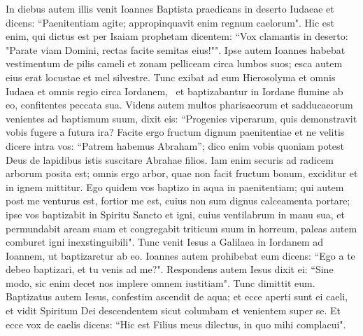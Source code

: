 \begin{biblechapter}  
\verse In diebus autem illis venit Ioannes Baptista praedicans in deserto Iudaeae 
\verse et dicens: “Paenitentiam agite; appropinquavit enim regnum caelorum". 
\verse Hic est enim, qui dictus est per Isaiam prophetam dicentem: “Vox clamantis in deserto: "Parate viam Domini, rectas facite semitas eius!"". 
\verse Ipse autem Ioannes habebat vestimentum de pilis cameli et zonam pelliceam circa lumbos suos; esca autem eius erat locustae et mel silvestre. 
\verse Tunc exibat ad eum Hierosolyma et omnis Iudaea et omnis regio circa Iordanem,  
\verse et baptizabantur in Iordane flumine ab eo, confitentes peccata sua. 
\verse Videns autem multos pharisaeorum et sadducaeorum venientes ad baptismum suum, dixit eis: “Progenies viperarum, quis demonstravit vobis fugere a futura ira? 
\verse Facite ergo fructum dignum paenitentiae 
\verse et ne velitis dicere intra vos: “Patrem habemus Abraham”; dico enim vobis quoniam potest Deus de lapidibus istis suscitare Abrahae filios. 
\verse Iam enim securis ad radicem arborum posita est; omnis ergo arbor, quae non facit fructum bonum, exciditur et in ignem mittitur. 
\verse Ego quidem vos baptizo in aqua in paenitentiam; qui autem post me venturus est, fortior me est, cuius non sum dignus calceamenta portare; ipse vos baptizabit in Spiritu Sancto et igni, 
\verse cuius ventilabrum in manu sua, et permundabit aream suam et congregabit triticum suum in horreum, paleas autem comburet igni inexstinguibili". 
\verse Tunc venit Iesus a Galilaea in Iordanem ad Ioannem, ut baptizaretur ab eo.  
\verse Ioannes autem prohibebat eum dicens: “Ego a te debeo baptizari, et tu venis ad me?". 
\verse Respondens autem Iesus dixit ei: “Sine modo, sic enim decet nos implere omnem iustitiam". Tunc dimittit eum. 
\verse Baptizatus autem Iesus, confestim ascendit de aqua; et ecce aperti sunt ei caeli, et vidit Spiritum Dei descendentem sicut columbam et venientem super se. 
\verse Et ecce vox de caelis dicens: “Hic est Filius meus dilectus, in quo mihi complacui". 
\end{biblechapter}

